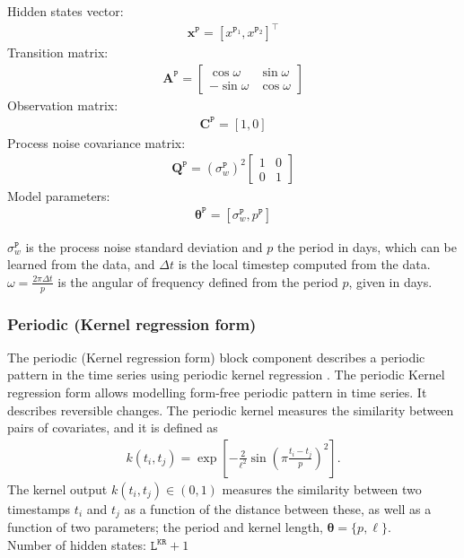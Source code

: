 Hidden states vector: 
\begin{gather*}
\mathbf{x}^{\mathtt{P}} = [x^{\mathtt{P}_ {1}}, x^{\mathtt{P}_{2}}]^{\intercal}
\end{gather*}
Transition matrix: 
\begin{gather*}
\mathbf{A}^{\mathtt{P}}= \left[\begin{array}{cc}\cos \omega &\sin \omega\\-\sin \omega&\cos \omega\end{array}\right]
\end{gather*}
Observation matrix: 
\begin{gather*}
\mathbf{C}^{\mathtt{P}}=[1, 0]
\end{gather*}
Process noise covariance matrix:
\begin{gather*}
\mathbf{Q}^{\mathtt{P}}=(\sigma_{w}^{\mathtt{P}})^{2}\left[\begin{array}{cc}1 &0\\0&1\end{array}\right]
\end{gather*}
Model parameters: 
\begin{gather*}
\bm\theta^{\mathtt{P}}=[\sigma_{w}^{\mathtt{P}}, p^{\mathtt{P}} ]
\end{gather*}

\noindent
$\sigma_{w}^{\mathtt{P}}$ is the process noise standard deviation and $p$ the period in days, which can be learned from the data, and $\Delta t$ is the local timestep computed from the data.
 $\omega=\frac{2\pi \Delta t}{p}$ is the angular of frequency defined from the period $p$, given in days.


\subsubsection{Periodic (Kernel regression form)}\label{SSS:KR}

The periodic (Kernel regression form) block component describes a periodic pattern in the time series using periodic kernel regression  \cite{Nguyen2019KRBDLM}. 
The periodic Kernel regression form allows modelling form-free periodic pattern in time series.
It describes reversible changes.
The periodic kernel measures the similarity between pairs of covariates, and it is defined as
\begin{gather*}
k(t_{i},t_{j})=\exp\left[-\frac{2}{\ell^2}\sin\left( \pi\frac{t_i-t_{j}}{p}\right)^{2}\right].
\end{gather*}
The kernel output $k(t_{i},t_{j})\in(0,1)$ measures the similarity between two timestamps $t_{i}$ and $t_{j}$ as a function of the distance between these, as well as a function of two parameters; the period and kernel length, $\bm{\theta}=\{p,\ell\}$.
\noindent\\
Number of hidden states:  $\mathtt{L}^{\mathtt{KR}}+1$\\

